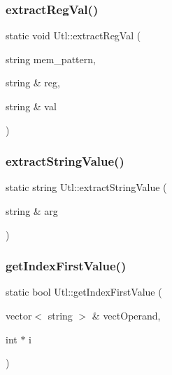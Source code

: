 \subsubsection{\texorpdfstring{extract\+Reg\+Val()}{extractRegVal()}}
{\footnotesize\ttfamily static void Utl\+::extract\+Reg\+Val (\begin{DoxyParamCaption}\item[{string}]{mem\+\_\+pattern,  }\item[{string \&}]{reg,  }\item[{string \&}]{val }\end{DoxyParamCaption})\hspace{0.3cm}{\ttfamily [static]}}

\mbox{\label{classUtl_ab5e45ebcf3f1ae1b877c1d0ce274803a}} 
\subsubsection{\texorpdfstring{extract\+String\+Value()}{extractStringValue()}}
{\footnotesize\ttfamily static string Utl\+::extract\+String\+Value (\begin{DoxyParamCaption}\item[{string \&}]{arg }\end{DoxyParamCaption})\hspace{0.3cm}{\ttfamily [static]}}

\mbox{\label{classUtl_a0a5af3a4ae8af28de9d536de731d86af}} 
\subsubsection{\texorpdfstring{get\+Index\+First\+Value()}{getIndexFirstValue()}}
{\footnotesize\ttfamily static bool Utl\+::get\+Index\+First\+Value (\begin{DoxyParamCaption}\item[{vector$<$ string $>$ \&}]{vect\+Operand,  }\item[{int $\ast$}]{i }\end{DoxyParamCaption})\hspace{0.3cm}{\ttfamily [static]}}

\mbox{\label{classUtl_ab2ade6c1ce649f2540a5695e1f07beb7}} 

